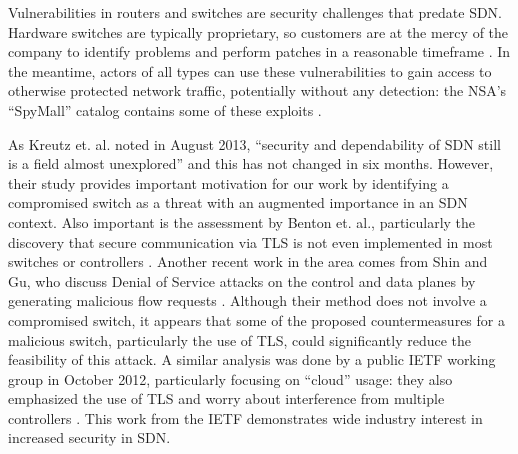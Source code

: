 Vulnerabilities in routers and switches are security challenges that predate SDN.  Hardware switches are typically proprietary, so customers are at the mercy of the company to identify problems and perform patches in a reasonable timeframe \cite{cisco}\cite{ciscopatch}.  In the meantime, actors of all types can use these vulnerabilities to gain access to otherwise protected network traffic, potentially without any detection: the NSA's ``SpyMall'' catalog contains some of these exploits \cite{spymall}.

As Kreutz et. al. noted in August 2013, ``security and dependability of SDN still is a field almost unexplored'' \cite{sdnsec} and this has not changed in six months.  However, their study provides important motivation for our work by identifying a compromised switch as a threat with an augmented importance in an SDN context.  Also important is the assessment by Benton et. al., particularly the discovery that secure communication via TLS is not even implemented in most switches or controllers \cite{benton}.  Another recent work in the area comes from Shin and Gu, who discuss Denial of Service attacks on the control and data planes by generating malicious flow requests \cite{attacking}.  Although their method does not involve a compromised switch, it appears that some of the proposed countermeasures for a malicious switch, particularly the use of TLS, could significantly reduce the feasibility of this attack.  A similar analysis was done by a public IETF working group in October 2012, particularly focusing on ``cloud'' usage: they also emphasized the use of TLS and worry about interference from multiple controllers \cite{ietf}.  This work from the IETF demonstrates wide industry interest in increased security in SDN.
